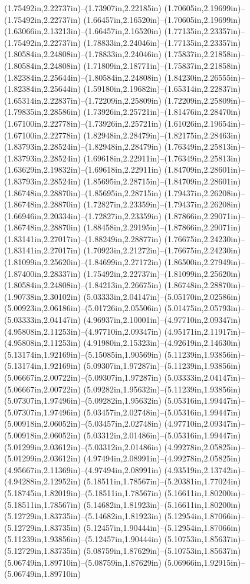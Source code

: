 (1.75492in,2.22737in)--(1.73907in,2.22185in) (1.70605in,2.19699in)--(1.75492in,2.22737in) (1.66457in,2.16520in)--(1.70605in,2.19699in) (1.63066in,2.13213in)--(1.66457in,2.16520in) (1.77135in,2.23357in)--(1.75492in,2.22737in) (1.78833in,2.24046in)--(1.77135in,2.23357in) (1.80584in,2.24808in)--(1.78833in,2.24046in) (1.75837in,2.21858in)--(1.80584in,2.24808in) (1.71809in,2.18771in)--(1.75837in,2.21858in) (1.82384in,2.25644in)--(1.80584in,2.24808in) (1.84230in,2.26555in)--(1.82384in,2.25644in) (1.59180in,2.19682in)--(1.65314in,2.22837in) (1.65314in,2.22837in)--(1.72209in,2.25809in) (1.72209in,2.25809in)--(1.79835in,2.28586in) (1.73926in,2.25721in)--(1.81476in,2.28470in) (1.67100in,2.22778in)--(1.73926in,2.25721in) (1.61026in,2.19654in)--(1.67100in,2.22778in) (1.82948in,2.28479in)--(1.82175in,2.28463in) (1.83793in,2.28524in)--(1.82948in,2.28479in) (1.76349in,2.25813in)--(1.83793in,2.28524in) (1.69618in,2.22911in)--(1.76349in,2.25813in) (1.63629in,2.19832in)--(1.69618in,2.22911in) (1.84709in,2.28601in)--(1.83793in,2.28524in) (1.85695in,2.28715in)--(1.84709in,2.28601in) (1.86748in,2.28870in)--(1.85695in,2.28715in) (1.79437in,2.26208in)--(1.86748in,2.28870in) (1.72827in,2.23359in)--(1.79437in,2.26208in) (1.66946in,2.20334in)--(1.72827in,2.23359in) (1.87866in,2.29071in)--(1.86748in,2.28870in) (1.88458in,2.29195in)--(1.87866in,2.29071in) (1.83141in,2.27017in)--(1.88249in,2.28877in) (1.76675in,2.24230in)--(1.83141in,2.27017in) (1.70923in,2.21272in)--(1.76675in,2.24230in) (1.81099in,2.25620in)--(1.84699in,2.27172in) (1.86500in,2.27949in)--(1.87400in,2.28337in) (1.75492in,2.22737in)--(1.81099in,2.25620in) (1.80584in,2.24808in)--(1.84213in,2.26675in) (1.86748in,2.28870in)--(1.90738in,2.30102in) (5.03333in,2.04147in)--(5.05170in,2.02586in) (5.00923in,2.06186in)--(5.01726in,2.05506in) (5.01475in,2.05793in)--(5.03333in,2.04147in) (4.96937in,2.10001in)--(4.97710in,2.09347in) (4.95808in,2.11253in)--(4.97710in,2.09347in) (4.95171in,2.11917in)--(4.95808in,2.11253in) (4.91980in,2.15323in)--(4.92619in,2.14630in) (5.13174in,1.92169in)--(5.15085in,1.90569in) (5.11239in,1.93856in)--(5.13174in,1.92169in) (5.09307in,1.97287in)--(5.11239in,1.93856in) (5.06667in,2.00722in)--(5.09307in,1.97287in) (5.03333in,2.04147in)--(5.06667in,2.00722in) (5.09282in,1.95632in)--(5.11239in,1.93856in) (5.07307in,1.97496in)--(5.09282in,1.95632in) (5.05316in,1.99447in)--(5.07307in,1.97496in) (5.03457in,2.02748in)--(5.05316in,1.99447in) (5.00918in,2.06052in)--(5.03457in,2.02748in) (4.97710in,2.09347in)--(5.00918in,2.06052in) (5.03312in,2.01486in)--(5.05316in,1.99447in) (5.01299in,2.03612in)--(5.03312in,2.01486in) (4.99278in,2.05825in)--(5.01299in,2.03612in) (4.97494in,2.08991in)--(4.99278in,2.05825in) (4.95667in,2.11369in)--(4.97494in,2.08991in) (4.93519in,2.13742in)--(4.94288in,2.12952in) (5.18511in,1.78567in)--(5.20381in,1.77024in) (5.18745in,1.82019in)--(5.18511in,1.78567in) (5.16611in,1.80200in)--(5.18511in,1.78567in) (5.14682in,1.81923in)--(5.16611in,1.80200in) (5.12729in,1.83735in)--(5.14682in,1.81923in) (5.12954in,1.87066in)--(5.12729in,1.83735in) (5.12457in,1.90444in)--(5.12954in,1.87066in) (5.11239in,1.93856in)--(5.12457in,1.90444in) (5.10753in,1.85637in)--(5.12729in,1.83735in) (5.08759in,1.87629in)--(5.10753in,1.85637in) (5.06749in,1.89710in)--(5.08759in,1.87629in) (5.06966in,1.92915in)--(5.06749in,1.89710in) 